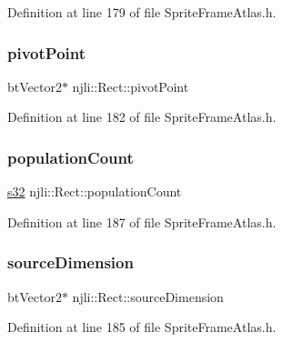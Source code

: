 Definition at line 179 of file Sprite\+Frame\+Atlas.\+h.

\mbox{\label{classnjli_1_1_rect_a5108b573ccf0471fe3df6d8b81409584}} 
\subsubsection{\texorpdfstring{pivot\+Point}{pivotPoint}}
{\footnotesize\ttfamily bt\+Vector2$\ast$ njli\+::\+Rect\+::pivot\+Point\hspace{0.3cm}{\ttfamily [private]}}



Definition at line 182 of file Sprite\+Frame\+Atlas.\+h.

\mbox{\label{classnjli_1_1_rect_a200cc3b5b916522d04e3efab3e0d81e7}} 
\subsubsection{\texorpdfstring{population\+Count}{populationCount}}
{\footnotesize\ttfamily \mbox{\hyperlink{_util_8h_aa62c75d314a0d1f37f79c4b73b2292e2}{s32}} njli\+::\+Rect\+::population\+Count\hspace{0.3cm}{\ttfamily [private]}}



Definition at line 187 of file Sprite\+Frame\+Atlas.\+h.

\mbox{\label{classnjli_1_1_rect_a1066fad026f447110bc3c4efe0ff3a32}} 
\subsubsection{\texorpdfstring{source\+Dimension}{sourceDimension}}
{\footnotesize\ttfamily bt\+Vector2$\ast$ njli\+::\+Rect\+::source\+Dimension\hspace{0.3cm}{\ttfamily [private]}}



Definition at line 185 of file Sprite\+Frame\+Atlas.\+h.

